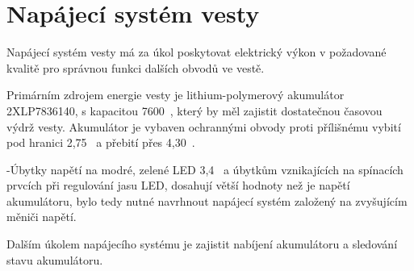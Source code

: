 \chapter{Napájecí systém vesty}
Napájecí systém vesty má za úkol poskytovat elektrický výkon v požadované kvalitě pro správnou funkci dalších obvodů ve vestě.

Primárním zdrojem energie vesty je lithium-polymerový akumulátor 2XLP7836140, s kapacitou 7600~, který by měl zajistit dostatečnou časovou výdrž vesty. Akumulátor je vybaven ochrannými obvody proti přílišnému vybití pod hranici 2,75~ a přebití přes 4,30~.

-Úbytky napětí na modré, zelené LED 3,4~ a úbytkům vznikajících na spínacích prvcích při regulování jasu LED, dosahují větší hodnoty než je napětí akumulátoru, bylo tedy nutné navrhnout napájecí systém založený na zvyšujícím měniči napětí.

Dalším úkolem napájecího systému je zajistit nabíjení akumulátoru a sledování stavu akumulátoru.

